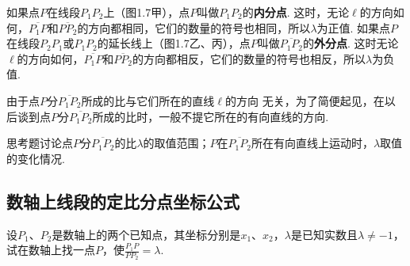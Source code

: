 \noindent
\begin{minipage}{.55\textwidth}
 \CTEXindent   如果点$P$在线段$P_1P_2$上（图1.7甲），点$P$叫做$P_1P_2$的\textbf{内分点}. 这时，无论$\ell$的方向如何，$\overline{P_1P}$和$\overline{PP_2}$的方向都相同，它们的数量的符号也相同，所以$\lambda$为正值. 如果点$P$在线段$P_2P_1$或$P_1P_2$的延长线上（图1.7乙、丙），点$P$叫做$\overline{P_1P_2}$的\textbf{外分点}. 这时无论$\ell$的方向如何，$\overline{P_1P}$和$\overline{PP_2}$的方向都相反，它们的数量的符号也相反，所以$\lambda$为负值.
\end{minipage}\hfill
\begin{minipage}{.4\textwidth}
\end{minipage}


由于点$P$分$\overline{P_1P_2}$所成的比与它们所在的直线$\ell$的方向
无关，为了简便起见，在以后谈到点$P$分$\overline{P_1P_2}$所成的比时，一般不提它所在的有向直线的方向.

\begin{thm}
    {思考题}讨论点$P$分$\overline{P_1P_2}$的比$\lambda$的取值范围；$P$在$\overline{P_1P_2}$所在有向直线上运动时，$\lambda$取值的变化情况.
\end{thm}

\subsection{数轴上线段的定比分点坐标公式}
设$P_1$、$P_2$是数轴上的两个已知点，其坐标分别是$x_1$、$x_2$，$\lambda$是已知实数且$\lambda\ne -1$，试在数轴上找一点$P$，使$\frac{P_1P}{PP_2}=\lambda$.

